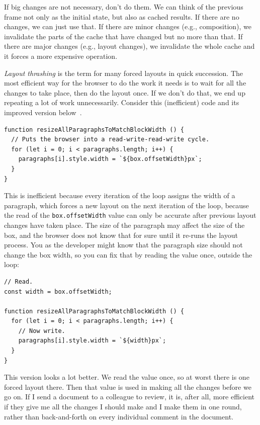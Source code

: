 If big changes are not necessary, don't do them. We can think of the previous frame not only as the initial state, but also as cached results. If there are no changes, we can just use that. If there are minor changes (e.g., composition), we invalidate the parts of the cache that have changed but no more than that. If there are major changes (e.g., layout changes), we invalidate the whole cache and it forces a more expensive operation.

\textit{Layout thrashing} is the term for many forced layouts in quick succession. The most efficient way for the browser to do the work it needs is to wait for all the changes to take place, then do the layout once. If we don't do that, we end up repeating a lot of work unnecessarily. Consider this (inefficient) code and its improved version below~\cite{layoutthrashing}.

\begin{lstlisting}
function resizeAllParagraphsToMatchBlockWidth () {
  // Puts the browser into a read-write-read-write cycle.
  for (let i = 0; i < paragraphs.length; i++) {
    paragraphs[i].style.width = `${box.offsetWidth}px`;
  }
}
\end{lstlisting}

This is inefficient because every iteration of the loop assigns the width of a paragraph, which forces a new layout on the next iteration of the loop, because the read of the \texttt{box.offsetWidth} value can only be accurate after previous layout changes have taken place. The size of the paragraph may affect the size of the box, and the browser does not know that for sure until it re-runs the layout process. You as the developer might know that the paragraph size should not change the box width, so you can fix that by reading the value once, outside the loop:

\begin{lstlisting}
// Read.
const width = box.offsetWidth;

function resizeAllParagraphsToMatchBlockWidth () {
  for (let i = 0; i < paragraphs.length; i++) {
    // Now write.
    paragraphs[i].style.width = `${width}px`;
  }
}
\end{lstlisting}

This version looks a lot better. We read the value once, so at worst there is one forced layout there. Then that value is used in making all the changes before we go on. If I send a document to a colleague to review, it is, after all, more efficient if they give me all the changes I should make and I make them in one round, rather than back-and-forth on every individual comment in the document.

